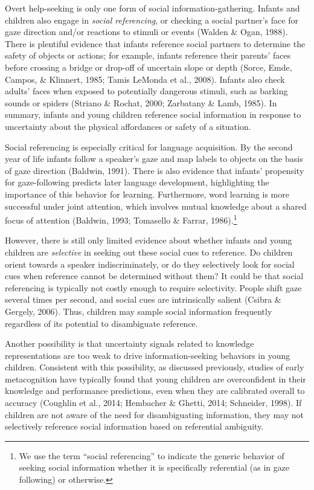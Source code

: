 \documentclass[a4paper,man,apacite,floatsintext]{apa6}
\begin{document}
Overt help-seeking is only one form of social information-gathering.
Infants and children also engage in \emph{social referencing}, or
checking a social partner's face for gaze direction and/or reactions to
stimuli or events (Walden \& Ogan, 1988). There is plentiful evidence
that infants reference social partners to determine the safety of
objects or actions; for example, infants reference their parents' faces
before crossing a bridge or drop-off of uncertain slope or depth (Sorce,
Emde, Campos, \& Klinnert, 1985; Tamis LeMonda et al., 2008). Infants
also check adults' faces when exposed to potentially dangerous stimuli,
such as barking sounds or spiders (Striano \& Rochat, 2000; Zarbatany \&
Lamb, 1985). In summary, infants and young children reference social
information in response to uncertainty about the physical affordances or
safety of a situation.

Social referencing is especially critical for language acquisition. By
the second year of life infants follow a speaker's gaze and map labels
to objects on the basis of gaze direction (Baldwin, 1991). There is also
evidence that infants' propensity for gaze-following predicts later
language development, highlighting the importance of this behavior for
learning. Furthermore, word learning is more successful under joint
attention, which involves mutual knowledge about a shared focus of
attention (Baldwin, 1993; Tomasello \& Farrar, 1986).\footnote{We use
  the term ``social referencing'' to indicate the generic behavior of
  seeking social information whether it is specifically referential (as
  in gaze following) or otherwise.}

However, there is still only limited evidence about whether infants and
young children are \emph{selective} in seeking out these social cues to
reference. Do children orient towards a speaker indiscriminately, or do
they selectively look for social cues when reference cannot be
determined without them? It could be that social referencing is
typically not costly enough to require selectivity. People shift gaze
several times per second, and social cues are intrinsically salient
(Csibra \& Gergely, 2006). Thus, children may sample social information
frequently regardless of its potential to disambiguate reference.

Another possibility is that uncertainty signals related to knowledge
representations are too weak to drive information-seeking behaviors in
young children. Consistent with this possibility, as discussed
previously, studies of early metacognition have typically found that
young children are overconfident in their knowledge and performance
predictions, even when they are calibrated overall to accuracy (Coughlin
et al., 2014; Hembacher \& Ghetti, 2014; Schneider, 1998). If children
are not aware of the need for disambiguating information, they may not
selectively reference social information based on referential ambiguity.
\end{document}
